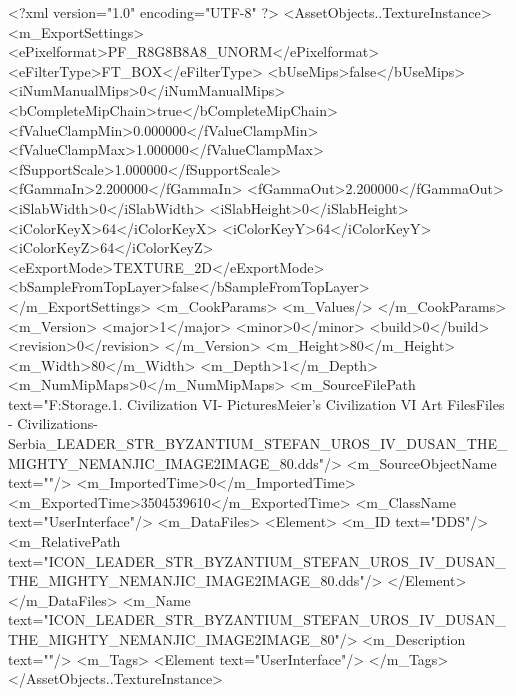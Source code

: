 <?xml version="1.0" encoding="UTF-8" ?>
<AssetObjects..TextureInstance>
	<m_ExportSettings>
		<ePixelformat>PF_R8G8B8A8_UNORM</ePixelformat>
		<eFilterType>FT_BOX</eFilterType>
		<bUseMips>false</bUseMips>
		<iNumManualMips>0</iNumManualMips>
		<bCompleteMipChain>true</bCompleteMipChain>
		<fValueClampMin>0.000000</fValueClampMin>
		<fValueClampMax>1.000000</fValueClampMax>
		<fSupportScale>1.000000</fSupportScale>
		<fGammaIn>2.200000</fGammaIn>
		<fGammaOut>2.200000</fGammaOut>
		<iSlabWidth>0</iSlabWidth>
		<iSlabHeight>0</iSlabHeight>
		<iColorKeyX>64</iColorKeyX>
		<iColorKeyY>64</iColorKeyY>
		<iColorKeyZ>64</iColorKeyZ>
		<eExportMode>TEXTURE_2D</eExportMode>
		<bSampleFromTopLayer>false</bSampleFromTopLayer>
	</m_ExportSettings>
	<m_CookParams>
		<m_Values/>
	</m_CookParams>
	<m_Version>
		<major>1</major>
		<minor>0</minor>
		<build>0</build>
		<revision>0</revision>
	</m_Version>
	<m_Height>80</m_Height>
	<m_Width>80</m_Width>
	<m_Depth>1</m_Depth>
	<m_NumMipMaps>0</m_NumMipMaps>
	<m_SourceFilePath text="F:\Mod Storage\2.1. Civilization VI\Mods\Archive - Pictures\Sid Meier's Civilization VI Art Files\Art Files - Civilizations\Civilization - Serbia\ICON_LEADER_STR_BYZANTIUM_STEFAN_UROS_IV_DUSAN_THE_MIGHTY_NEMANJIC_IMAGE2IMAGE_80.dds"/>
	<m_SourceObjectName text=""/>
	<m_ImportedTime>0</m_ImportedTime>
	<m_ExportedTime>3504539610</m_ExportedTime>
	<m_ClassName text="UserInterface"/>
	<m_DataFiles>
		<Element>
			<m_ID text="DDS"/>
			<m_RelativePath text="ICON_LEADER_STR_BYZANTIUM_STEFAN_UROS_IV_DUSAN_THE_MIGHTY_NEMANJIC_IMAGE2IMAGE_80.dds"/>
		</Element>
	</m_DataFiles>
	<m_Name text="ICON_LEADER_STR_BYZANTIUM_STEFAN_UROS_IV_DUSAN_THE_MIGHTY_NEMANJIC_IMAGE2IMAGE_80"/>
	<m_Description text=""/>
	<m_Tags>
		<Element text="UserInterface"/>
	</m_Tags>
</AssetObjects..TextureInstance>

